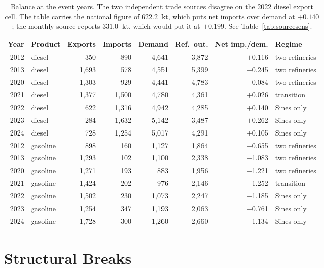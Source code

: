\documentclass[11pt,a4paper]{article}
\begin{document}
\begin{table}[htbp]
\centering
\caption{Balance at the event years. The two independent trade sources disagree on the 2022
diesel export cell. The table carries the national figure of $622.2$~kt, which puts net imports
over demand at $+0.140$; the monthly source reports $331.0$~kt, which would put it at $+0.199$. See Table~\ref{tab:sourcesens}.}
\label{tab:headline}
\small
\begin{tabular}{rlrrrrrl}
\toprule
Year & Product & Exports & Imports & Demand & Ref.\ out. & Net imp./dem. & Regime \\
\midrule
2012 & diesel & 350 & 890 & 4{,}641 & 3{,}872 & $+$0.116 & two refineries \\
2013 & diesel & 1{,}693 & 578 & 4{,}551 & 5{,}399 & $-$0.245 & two refineries \\
2020 & diesel & 1{,}303 & 929 & 4{,}441 & 4{,}783 & $-$0.084 & two refineries \\
2021 & diesel & 1{,}377 & 1{,}500 & 4{,}780 & 4{,}361 & $+$0.026 & transition \\
2022 & diesel & 622 & 1{,}316 & 4{,}942 & 4{,}285 & $+$0.140 & Sines only \\
2023 & diesel & 284 & 1{,}632 & 5{,}142 & 3{,}487 & $+$0.262 & Sines only \\
2024 & diesel & 728 & 1{,}254 & 5{,}017 & 4{,}291 & $+$0.105 & Sines only \\
\midrule
2012 & gasoline & 898 & 160 & 1{,}127 & 1{,}864 & $-$0.655 & two refineries \\
2013 & gasoline & 1{,}293 & 102 & 1{,}100 & 2{,}338 & $-$1.083 & two refineries \\
2020 & gasoline & 1{,}271 & 193 & 883 & 1{,}956 & $-$1.221 & two refineries \\
2021 & gasoline & 1{,}424 & 202 & 976 & 2{,}146 & $-$1.252 & transition \\
2022 & gasoline & 1{,}502 & 230 & 1{,}073 & 2{,}247 & $-$1.185 & Sines only \\
2023 & gasoline & 1{,}254 & 347 & 1{,}193 & 2{,}063 & $-$0.761 & Sines only \\
2024 & gasoline & 1{,}728 & 300 & 1{,}260 & 2{,}660 & $-$1.134 & Sines only \\
\bottomrule
\end{tabular}
\end{table}

\section{Structural Breaks}
\end{document}
